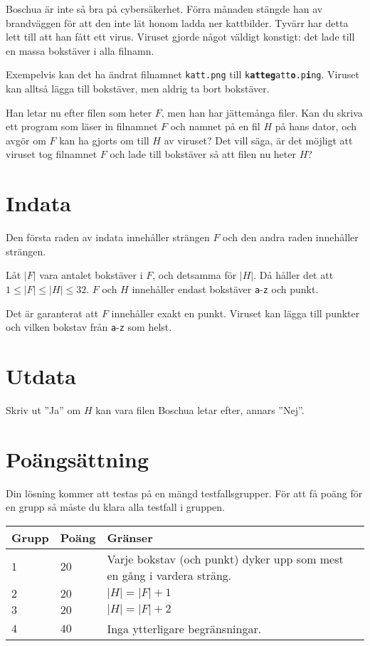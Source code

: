 
\noindent

Boschua är inte så bra på cybersäkerhet. Förra månaden stängde han av brandväggen för att den
inte lät honom ladda ner kattbilder. Tyvärr har detta lett till att han fått ett virus. 
Viruset gjorde något väldigt konstigt: det lade till en massa bokstäver i alla filnamn.

Exempelvis kan det ha ändrat filnamnet \texttt{katt.png} till \texttt{k\textbf{atteg}att\textbf{o}.p\textbf{i}ng}.
Viruset kan alltså lägga till bokstäver, men aldrig ta bort bokstäver.

Han letar nu  efter filen som heter $F$, men han har jättemånga filer. Kan du skriva ett program som läser in filnamnet $F$ och namnet på en fil $H$
på hans dator, och avgör om $F$ kan ha gjorts om till $H$ av viruset? Det vill säga, är det möjligt att
viruset tog filnamnet $F$ och lade till bokstäver så att filen nu heter $H$?


\section*{Indata}
Den första raden av indata innehåller strängen $F$ och den andra raden innehåller strängen.

Låt $|F|$ vara antalet bokstäver i $F$, och detsamma för $|H|$.
Då håller det att $1 \le |F| \le |H| \le 32$. $F$ och $H$ innehåller endast bokstäver \texttt{a}-\texttt{z} och punkt.

Det är garanterat att $F$ innehåller exakt en punkt. Viruset kan lägga till punkter och vilken bokstav från \texttt{a}-\texttt{z} som helst.


\section*{Utdata}
Skriv ut ''Ja'' om $H$ kan vara filen Boschua letar efter, annars ''Nej''.

\section*{Poängsättning}
Din lösning kommer att testas på en mängd testfallsgrupper.
För att få poäng för en grupp så måste du klara alla testfall i gruppen.


\noindent
\begin{tabular}{| l | l | p{12cm} |}
  \hline
  \textbf{Grupp} & \textbf{Poäng} & \textbf{Gränser} \\ \hline
  $1$    & $20$       & Varje bokstav (och punkt) dyker upp som mest en gång i vardera sträng. \\ \hline
  $2$    & $20$       & $|H| = |F|+1$ \\ \hline
  $3$    & $20$       & $|H| = |F|+2$ \\ \hline
  $4$    & $40$       & Inga ytterligare begränsningar. \\ \hline
\end{tabular}


